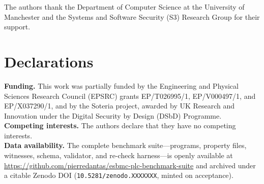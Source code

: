 \documentclass[smallextended]{svjour3}   %
\begin{document}
\begin{acknowledgements}
The authors thank the Department of Computer Science at the University of Manchester and the
Systems and Software Security (S3) Research Group for their support.
\end{acknowledgements}

\section*{Declarations}
\noindent\textbf{Funding.} This work was partially funded by the Engineering and Physical
Sciences Research Council (EPSRC) grants EP/T026995/1, EP/V000497/1, and EP/X037290/1, and by
the Soteria project, awarded by UK Research and Innovation under the Digital Security by Design
(DSbD) Programme.\\[2pt]
\textbf{Competing interests.} The authors declare that they have no competing interests.\\[2pt]
\textbf{Data availability.} The complete benchmark suite---programs, property files, witnesses,
schema, validator, and re-check harness---is openly available at
\url{https://github.com/pierredantas/esbmc-plc-benchmark-suite} and archived under a citable
Zenodo DOI (\texttt{10.5281/zenodo.XXXXXXX}, minted on acceptance).


\end{document}
